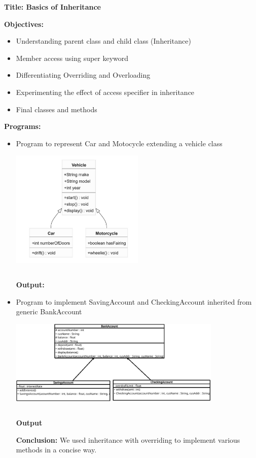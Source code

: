 \documentclass{book}
\begin{document}
{\Huge \textbf{Title: Basics of Inheritance}}
\par
{\large
\textbf{Objectives: }}
\begin{itemize}
    \item{Understanding parent class and child class (Inheritance)}
    \item{Member access using super keyword}
    \item{Differentiating Overriding and Overloading}
    \item{Experimenting the effect of access specifier in inheritance}
    \item{Final classes and methods}
\end{itemize}
\par
\textbf{Programs:}
\begin{itemize}
    \item{Program to represent Car and Motocycle extending a vehicle class}
    \par
    \begin{center}
    \includegraphics[width=0.5\textwidth,keepaspectratio]{vehicleClassDiagram}
    \end{center}
    \par
    \inputminted{java}{VehicleApp.java}
    \textbf{Output:}
    

    \item{Program to implement SavingAccount and CheckingAccount inherited from generic BankAccount}
    \begin{center}
        \includegraphics[width=0.8\textwidth,keepaspectratio]{BankClassDiagram}
    \end{center}
    \inputminted{java}{Bank.java}
    \textbf{Output}
    
    \par
    \textbf{Conclusion:} We used inheritance with overriding to implement various methods in a concise way.
\end{itemize}
\end{document}

